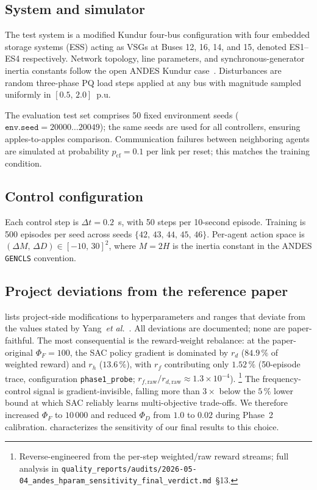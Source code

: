 \documentclass[journal,onecolumn,11pt]{IEEEtran}
\begin{document}
\subsection{System and simulator}

The test system is a modified Kundur four-bus configuration with four
embedded storage systems (ESS) acting as VSGs at Buses 12, 16, 14, and
15, denoted ES1--ES4 respectively. Network topology, line parameters,
and synchronous-generator inertia constants follow the open ANDES
Kundur case~\cite{cui2021andes}. Disturbances are random three-phase
PQ load steps applied at any bus with magnitude sampled uniformly in
$[0.5,\,2.0]$~p.u.

The evaluation test set comprises 50 fixed environment seeds
($\texttt{env.seed} = 20000\ldots20049$); the same seeds are used for
all controllers, ensuring apples-to-apples comparison. Communication
failures between neighboring agents are simulated at probability
$p_{\text{cf}} = 0.1$ per link per reset; this matches the training
condition.

\subsection{Control configuration}

Each control step is $\Delta t = 0.2$~s, with 50 steps per
10-second episode. Training is 500 episodes per seed across seeds
$\{42,\,43,\,44,\,45,\,46\}$. Per-agent action space is
$(\Delta M,\,\Delta D) \in [-10,\,30]^2$, where $M = 2H$ is the inertia
constant in the ANDES \texttt{GENCLS} convention.

\subsection{Project deviations from the reference paper}

 lists project-side modifications to
hyperparameters and ranges that deviate from the values stated by
Yang~\emph{et al.}~\cite{yang2023ddic}. All deviations are documented;
none are paper-faithful. The most consequential is the reward-weight
rebalance: at the paper-original $\Phi_F = 100$, the SAC policy
gradient is dominated by $r_d$ ($84.9\,\%$ of weighted reward) and
$r_h$ ($13.6\,\%$), with $r_f$ contributing only $1.52\,\%$
(50-episode trace, configuration \texttt{phase1\_probe};
$r_{f,\text{raw}} / r_{d,\text{raw}} \approx 1.3 \times 10^{-4}$).%
\footnote{Reverse-engineered from the per-step weighted/raw reward
streams; full analysis in
\texttt{quality\_reports/audits/2026-05-04\_andes\_hparam\_sensitivity\_final\_verdict.md}~\S13.}
The frequency-control signal is gradient-invisible, falling more than
$3\times$ below the $5\,\%$ lower bound at which SAC reliably learns
multi-objective trade-offs. We therefore increased $\Phi_F$ to
$10\,000$ and reduced $\Phi_D$ from $1.0$ to $0.02$ during Phase~2
calibration.  characterizes the
sensitivity of our final results to this choice.
\end{document}
